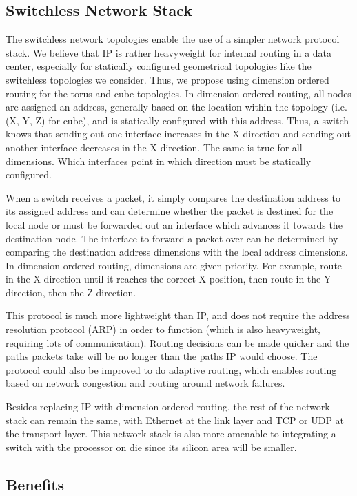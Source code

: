 \subsection{Switchless Network Stack}

The switchless network topologies enable the use of a simpler network protocol stack.  We believe that IP is rather heavyweight for internal routing in a data center, especially for statically configured geometrical topologies like the switchless topologies we consider.  Thus, we propose using dimension ordered routing for the torus and cube topologies.  In dimension ordered routing, all nodes are assigned an address, generally based on the location within the topology (i.e. (X, Y, Z) for cube), and is statically configured with this address.  Thus, a switch knows that sending out one interface increases in the X direction and sending out another interface decreases in the X direction.  The same is true for all dimensions.  Which interfaces point in which direction must be statically configured.  

When a switch receives a packet, it simply compares the destination address to its assigned address and can determine whether the packet is destined for the local node or must be forwarded out an interface which advances it towards the destination node.  The interface to forward a packet over can be determined by comparing the destination address dimensions with the local address dimensions.  In dimension ordered routing, dimensions are given priority.  For example, route in the X direction until it reaches the correct X position, then route in the Y direction, then the Z direction.

This protocol is much more lightweight than IP, and does not require the address resolution protocol (ARP) in order to function (which is also heavyweight, requiring lots of communication).  Routing decisions can be made quicker and the paths packets take will be no longer than the paths IP would choose.  The protocol could also be improved to do adaptive routing, which enables routing based on network congestion and routing around network failures.  

Besides replacing IP with dimension ordered routing, the rest of the network stack can remain the same, with Ethernet at the link layer and TCP or UDP at the transport layer.  This network stack is also more amenable to integrating a switch with the processor on die since its silicon area will be smaller.

\subsection{Benefits}

